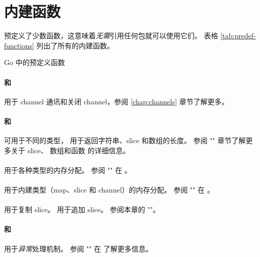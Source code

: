 \section{内建函数}
预定义了少数函数，这意味着\emph{无需}引用任何包就可以使用它们。
表格 \ref{tab:predef-functions} 列出了所有的内建函数。

\begin{table}[H]
\begin{center}
\caption{Go 中的预定义函数}
\label{tab:predef-functions}

\end{center}
\end{table}

\paragraph{ 和 } 用于 channel
通讯和关闭 channel，参阅 \ref{chap:channels} 章节了解更多。

\paragraph{ 和 } 可用于不同的类型，
 用于返回字符串、slice 和数组的长度。
参阅 "" 章节了解更多关于 slice、
数组和函数  的详细信息。

\paragraph{} 用于各种类型的内存分配。
参阅 "" 在 \pageref{sec:allocation with new}。

\paragraph{} 用于内建类型（map、slice 和 channel）的内存分配。
参阅 "" 在 \pageref{sec:allocation with make}。

\paragraph{} 用于复制 slice。 用于追加 slice。
参阅本章的 ""。

\paragraph{ 和 } 用于\emph{异常}处理机制。
参阅 "" 在 \pageref{sec:panic} 了解更多信息。

